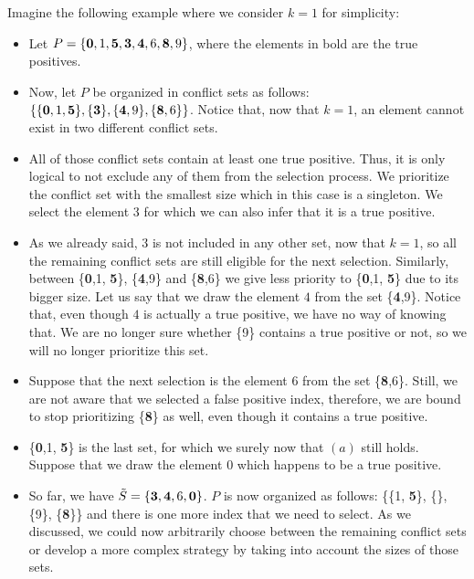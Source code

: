            \newpage
            Imagine the following example where we consider $k=1$ for simplicity:
            \begin{itemize}
                \item Let $P = \{{\bf 0}, 1, {\bf 5}, {\bf 3}, {\bf 4}, 6, {\bf 8}, 9\}$, where the elements in bold are the true positives.
                \item Now, let $P$ be organized in conflict sets as follows:
                $\{\{{\bf 0},1, {\bf 5}\}, \{{\bf 3}\}, \{{\bf 4},9\}, \{{\bf 8},6\}\}$.
                Notice that, now that $k=1$, an element cannot exist in two different conflict sets.
                    
                \item All of those conflict sets contain at least one true positive.
                Thus, it is only logical to not exclude any of them from the selection process.
                We prioritize the conflict set with the smallest size which in this case is a singleton. 
                We select the element $3$ for which we can also infer that it is a true positive.
                
                \item As we already said, $3$ is not included in any other set, now that $k=1$, so all the remaining conflict sets are still eligible for the next selection. 
                Similarly, between 
                \{{\bf 0},1, {\bf 5}\}, \{{\bf 4},9\} and \{{\bf 8},6\} we give less priority to \{{\bf 0},1, {\bf 5}\} due to its bigger size.
                Let us say that we draw the element $4$ from the set \{{\bf 4},9\}. Notice that, even though $4$ is actually a true positive, we have no way of knowing that. We are no longer sure whether \{9\} contains a true positive or not, so we will no longer prioritize this set.
                \item Suppose that the next selection is the element $6$ from the set \{{\bf 8},6\}. Still, we are not aware that we selected a false positive index, therefore, we are bound to stop prioritizing  \{{\bf 8}\} as well, even though it contains a true positive.
                \item \{{\bf 0},1, {\bf 5}\} is the last set, for which we surely now that $(a)$ still holds. Suppose that we draw the element $0$ which happens to be a true positive. 
                \item So far, we have $\tilde{S}=\{{\bf 3},{\bf 4},6, {\bf 0}\}$.
                $P$ is now organized as follows: \{\{1, {\bf 5}\}, \{\}, \{9\}, \{{\bf 8}\}\} and there is one more index that we need to select.
                As we discussed, we could now arbitrarily choose between the remaining conflict sets or develop a more complex strategy by taking into account the sizes of those sets.
                
                \end{itemize}
                
